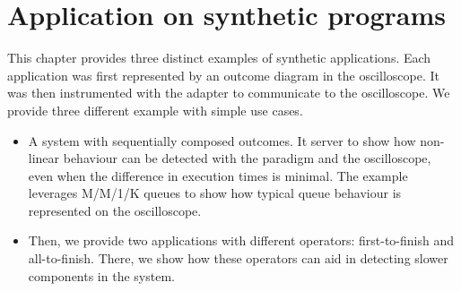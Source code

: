 \chapter{Application on synthetic programs}
    This chapter provides three distinct examples of synthetic applications. Each application was first represented by an outcome diagram in the oscilloscope. It was then instrumented with the adapter to communicate to the oscilloscope.
    We provide three different example with simple use cases.
    \begin{itemize}
        \item A system with sequentially composed outcomes. It server to show how non-linear behaviour can be detected with the paradigm and the oscilloscope, even when the difference in execution times is minimal. The example leverages M/M/1/K queues to show how typical queue behaviour is represented on the oscilloscope.
        \item Then, we provide two applications with different operators: first-to-finish and all-to-finish. There, we show how these operators can aid in detecting slower components in the system.
    \end{itemize}
    
    
    
